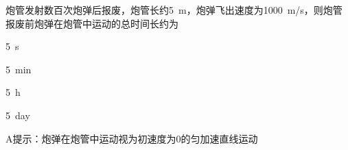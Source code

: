 炮管发射数百次炮弹后报废，炮管长约\qty{5}{m}，炮弹飞出速度为\qty{1000}{m/s}，则炮管报废前炮弹在炮管中运动的总时间长约为\paren[A]
\begin{choices}
	\item \qty{5}{s}
	\item \qty{5}{min}
	\item \qty{5}{h}
	\item \qty{5}{day}
\end{choices}
\begin{answer}
	A\qquad 提示：炮弹在炮管中运动视为初速度为0的匀加速直线运动
\end{answer}
